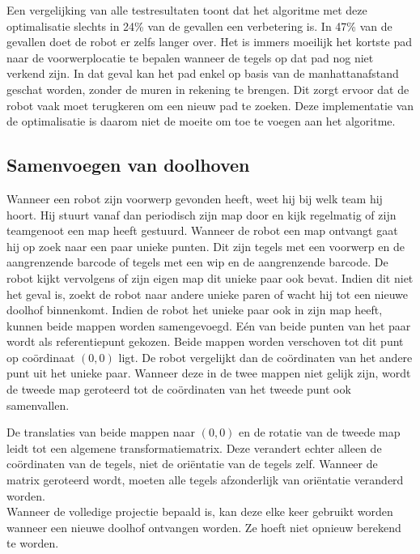 \documentclass[tt3]{penoverslag}
\begin{document}
Een vergelijking van alle testresultaten toont dat het algoritme met deze optimalisatie slechts in 24\% van de gevallen een verbetering is. In 47\% van de gevallen doet de robot er zelfs langer over. Het is immers moeilijk het kortste pad naar de voorwerplocatie te bepalen wanneer de tegels op dat pad nog niet verkend zijn. In dat geval kan het pad enkel op basis van de manhattanafstand geschat worden, zonder de muren in rekening te brengen. Dit zorgt ervoor dat de robot vaak moet terugkeren om een nieuw pad te zoeken. Deze implementatie van de optimalisatie is daarom niet de moeite om toe te voegen aan het algoritme. \\


\subsection{Samenvoegen van doolhoven}
\label{ssec:AlgoMappen}
Wanneer een robot zijn voorwerp gevonden heeft, weet hij bij welk team hij hoort. Hij stuurt vanaf dan periodisch zijn map door en kijk regelmatig of zijn teamgenoot een map heeft gestuurd.
Wanneer de robot een map ontvangt gaat hij op zoek naar een paar unieke punten. Dit zijn tegels met een voorwerp en de aangrenzende barcode of tegels met een wip en de aangrenzende barcode. De robot kijkt vervolgens of zijn eigen map dit unieke paar ook bevat. Indien dit niet het geval is, zoekt de robot naar andere unieke paren of wacht hij tot een nieuwe doolhof binnenkomt.
Indien de robot het unieke paar ook in zijn map heeft, kunnen beide mappen worden samengevoegd. E\'en van beide punten van het paar wordt als referentiepunt gekozen. Beide mappen worden verschoven tot dit punt op co\"ordinaat $(0,0)$ ligt. De robot vergelijkt dan de co\"ordinaten van het andere punt uit het unieke paar. Wanneer deze in de twee mappen niet gelijk zijn, wordt de tweede map geroteerd tot de co\"ordinaten van het tweede punt ook samenvallen.

De translaties van beide mappen naar $(0,0)$ en de rotatie van de tweede map leidt tot een algemene transformatiematrix. Deze verandert echter alleen de co\"ordinaten van de tegels, niet de ori\"entatie van de tegels zelf. Wanneer de matrix geroteerd wordt, moeten alle tegels afzonderlijk van ori\"entatie veranderd worden.\\

Wanneer de volledige projectie bepaald is, kan deze elke keer gebruikt worden wanneer een nieuwe doolhof ontvangen worden. Ze hoeft niet opnieuw berekend te worden.
\end{document}
